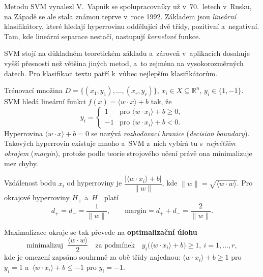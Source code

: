 \documentclass[11pt,a4paper]{article}
\theoremstyle{definition}
\begin{document}
Metodu SVM vynalezl V.~Vapnik se spolupracovníky už v~70.~letech v~Rusku, na Západě se ale
stala známou teprve v~roce 1992. Základem jsou \emph{lineární} klasifikátory, které hledají
hyperrovinu oddělující dvě třídy, pozitivní a~negativní. Tam, kde lineární separace nestačí,
nastupují \emph{kernelové} funkce.

SVM stojí na důkladném teoretickém základu a~zároveň v~aplikacích dosahuje vyšší přesnosti
než většina jiných metod, a~to zejména na vysokorozměrných datech. Pro klasifikaci textu
patří k~vůbec nejlepším klasifikátorům.

\begin{defbox}
Trénovací množina $D=\{(x_1,y_1),\dots,(x_r,y_r)\}$, $x_i\in X\subseteq\mathbb R^n$,
$y_i\in\{1,-1\}$. SVM hledá lineární funkci $f(x)=\langle w\cdot x\rangle+b$ tak, že
\[ y_i=\begin{cases}1 & \text{pro }\langle w\cdot x_i\rangle+b\ge 0,\\
-1 & \text{pro }\langle w\cdot x_i\rangle+b<0.\end{cases} \]
Hyperrovina $\langle w\cdot x\rangle+b=0$ se nazývá \emph{rozhodovací hranice}
(\emph{decision boundary}). Takových hyperrovin existuje mnoho a~SVM z~nich vybírá tu
s~\emph{největším okrajem} (\emph{margin}), protože podle teorie strojového učení právě ona
minimalizuje mez chyby.

Vzdálenost bodu $x_i$ od hyperroviny je $\dfrac{|\langle w\cdot x_i\rangle+b|}{\|w\|}$, kde
$\|w\|=\sqrt{\langle w\cdot w\rangle}$. Pro okrajové hyperroviny $H_+$ a~$H_-$ platí
\[ d_+=d_-=\frac{1}{\|w\|},\qquad \text{margin}=d_++d_-=\frac{2}{\|w\|}. \]

Maximalizace okraje se tak převede na \textbf{optimalizační úlohu}
\[ \text{minimalizuj }\ \frac{\langle w\cdot w\rangle}{2}
   \quad\text{za podmínek}\quad y_i\big(\langle w\cdot x_i\rangle+b\big)\ge 1,\
   i=1,\dots,r, \]
kde je omezení zapsáno souhrnně za obě třídy najednou: $\langle w\cdot x_i\rangle+b\ge 1$
pro $y_i=1$ a~$\langle w\cdot x_i\rangle+b\le -1$ pro $y_i=-1$.
\end{defbox}
\end{document}
